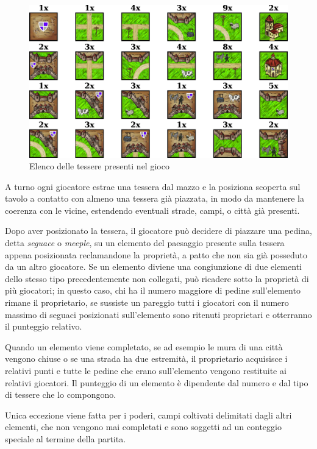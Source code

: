 \begin{figure}[H]
\centering
\includegraphics[width=\textwidth]{img/tiles.png}
\caption{Elenco delle tessere presenti nel gioco}
\label{img:tiles}
\end{figure}

A turno ogni giocatore estrae una tessera dal mazzo e la posiziona scoperta sul tavolo
a contatto con almeno una tessera già piazzata, in modo da mantenere la coerenza con le vicine, 
estendendo eventuali strade, campi, o citt\`a già presenti.

Dopo aver posizionato la tessera, il giocatore può decidere di piazzare
una pedina, detta \emph{seguace} o \emph{meeple}, su un elemento del paesaggio presente sulla tessera appena posizionata reclamandone la proprietà, a patto che non sia già posseduto da un altro giocatore.
Se un elemento diviene una congiunzione di due elementi dello stesso
tipo precedentemente non collegati, pu\`o ricadere sotto la propriet\`a di pi\`u giocatori; in questo caso, chi ha il numero maggiore di pedine sull'elemento rimane il proprietario, se sussiste un pareggio tutti i giocatori con il numero massimo di seguaci posizionati sull'elemento sono ritenuti proprietari e otterranno il punteggio relativo.

Quando un elemento viene completato, se ad esempio le mura di una città
vengono chiuse o se una strada ha due estremità, il proprietario acquisisce i relativi punti e tutte le pedine che erano sull'elemento vengono restituite ai relativi giocatori. Il punteggio di un
elemento è dipendente dal numero e dal tipo di tessere che lo compongono.

Unica eccezione viene fatta per i poderi, campi coltivati delimitati dagli altri elementi, che non vengono mai completati e sono soggetti ad un conteggio speciale al termine della partita.

